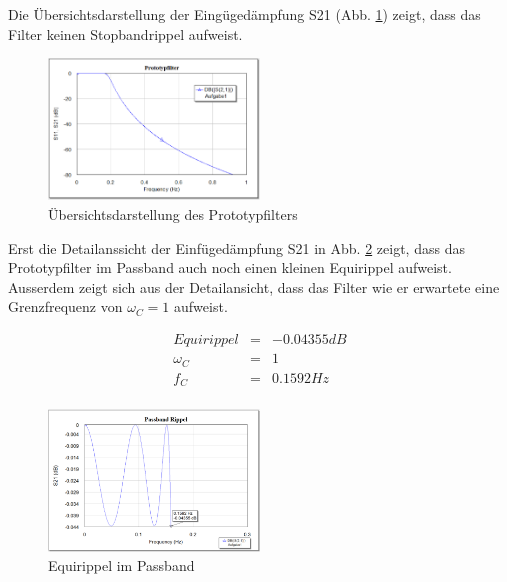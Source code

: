 Die Übersichtsdarstellung der Eingügedämpfung S21 (Abb. \ref{fig:Ovw_Prototyp}) zeigt, dass das Filter keinen Stopbandrippel aufweist.

\begin{figure}[h!]
\centering
 	\includegraphics[width=0.5\textwidth]{Ovw_Prototyp.png}
 	\caption{Übersichtsdarstellung des Prototypfilters}
 	\label{fig:Ovw_Prototyp}
\end{figure}

Erst die Detailanssicht der Einfügedämpfung S21 in Abb. \ref{fig:Prototyp_Passbandrippel} zeigt, dass das Prototypfilter im Passband auch noch einen kleinen Equirippel aufweist. Ausserdem zeigt sich aus der Detailansicht, dass das Filter wie er erwartete eine Grenzfrequenz von $\omega_C = 1$ aufweist.

\begin{mdframed}
\begin{equation*} 
\begin{array}{rclcl} 
Equirippel & = & -0.04355 dB \\ 
\omega_C & = & 1 \\ 
f_C & = & 0.1592 Hz \\ 
\end{array} 
\end{equation*} 
\end{mdframed}

\begin{figure}[h!]
\centering
 	\includegraphics[width=0.5\textwidth]{Prototyp_Passbandrippel.png}
 	\caption{Equirippel im Passband}
 	\label{fig:Prototyp_Passbandrippel}
\end{figure}

